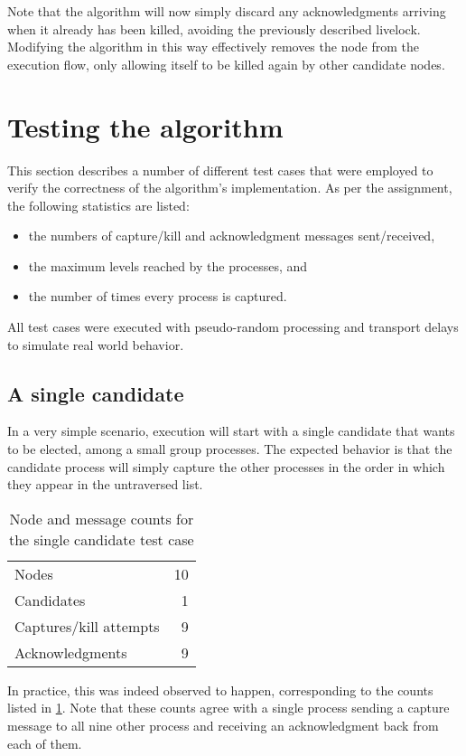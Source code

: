 \documentclass{article}
\begin{document}
Note that the algorithm will now simply discard any acknowledgments arriving when it already has been killed, avoiding the previously described livelock. Modifying the algorithm in this way effectively removes the node from the execution flow, only allowing itself to be killed again by other candidate nodes.

\section{Testing the algorithm}
This section describes a number of different test cases that were employed to verify the correctness of the algorithm's implementation. As per the assignment, the following statistics are listed:

\begin{itemize}
	\item the numbers of capture/kill and acknowledgment messages sent/received,
	\item the maximum levels reached by the processes, and
	\item the number of times every process is captured.
\end{itemize}

All test cases were executed with pseudo-random processing and transport delays to simulate real world behavior.

\subsection{A single candidate}
In a very simple scenario, execution will start with a single candidate that wants to be elected, among a small group processes. The expected behavior is that the candidate process will simply capture the other processes in the order in which they appear in the untraversed list.

\begin{table}[H]
	\centering
	\caption{Node and message counts for the single candidate test case}
	\begin{tabular}{l r}
		\toprule
		Nodes 					& 10	\\
		Candidates 				& 1 	\\
		Captures/kill attempts 	& 9		\\
		Acknowledgments 		& 9		\\
		\bottomrule
	\end{tabular}
	\label{tab:counts-single}
\end{table}

In practice, this was indeed observed to happen, corresponding to the counts listed in \cref{tab:counts-single}. Note that these counts agree with a single process sending a capture message to all nine other process and receiving an acknowledgment back from each of them.
\end{document}
